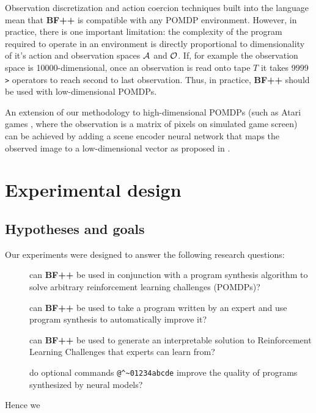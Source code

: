 Observation discretization and action coercion techniques built into the language mean that \textbf{BF++} is compatible with any POMDP environment. 
However, in practice, there is one important limitation: the complexity of the program required to operate in an environment is directly proportional to dimensionality of it's action and observation spaces $\mathcal{A}$ and $\mathcal{O}$. 
If, for example the observation space is 10000-dimensional, once an observation is read onto tape $T$ it takes 9999 \verb|>| operators to reach second to last observation.
Thus, in practice, \textbf{BF++} should be used with low-dimensional POMDPs.

An extension of our methodology to high-dimensional POMDPs (such as Atari games \cite{atari}, where the observation is a matrix of pixels on simulated game screen) can be achieved by adding a scene encoder neural network that maps the observed image to a low-dimensional vector as proposed in \cite{daqn}.

\newpage
\section{Experimental design}
\label{sec:bfpp-experiments}

\subsection{Hypotheses and goals}
\label{sec:exgoals}

Our experiments were designed to answer the following research questions:

\begin{description}
    \item[\rqbfpp] can \textbf{BF++} be used in conjunction with a program synthesis algorithm to solve arbitrary reinforcement learning challenges (POMDPs)?
    \item[\rqbfppexpert] can \textbf{BF++} be used to take a program written by an expert and use program synthesis to automatically improve it?
    \item[\rqbfppexplainable] can \textbf{BF++} be used to generate an interpretable solution to Reinforcement Learning Challenges that experts can learn from?
    \item[\rqbfppablation] do optional commands \verb|@^~01234abcde| improve the quality of programs synthesized by neural models?
\end{description}

Hence we

